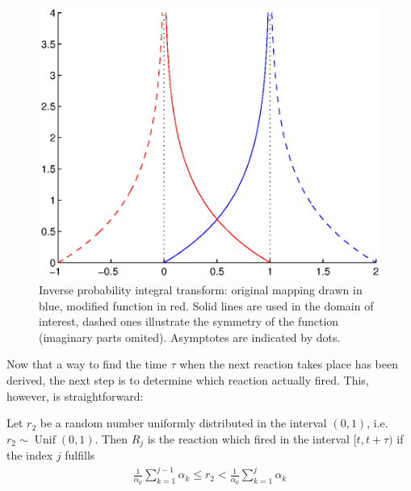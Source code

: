 \begin{figure}
\centering
\includegraphics[width=\textwidth]{images/inversetransform.eps}
\caption{Inverse probability integral transform: original mapping drawn in blue, modified function in red. Solid lines are used in the domain of interest, dashed ones illustrate the symmetry of the function (imaginary parts omited). Asymptotes are indicated by dots.}
\label{fig:inversetransform}
\end{figure}

Now that a way to find the time $\tau$ when the next reaction takes place has been derived, the next step is to determine which reaction actually fired. This, however, is straightforward: 

Let $r_2$ be a random number uniformly distributed in the interval $(0,1)$, i.e.\ $r_2 \sim \operatorname{Unif}(0,1)$. Then $R_j$ is the reaction which fired in the interval $\lbrack t,t+\tau)$ if the index $j$ fulfills
\begin{align}
\label{eq:nextr}
\frac{1}{\alpha_0} \sum_{k=1}^{j-1} \alpha_k \leq r_2 < \frac{1}{\alpha_0} \sum_{k=1}^{j} \alpha_k
\end{align}

